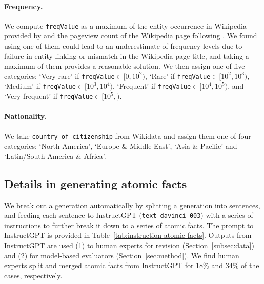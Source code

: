 \documentclass[11pt]{article}
\begin{document}
\paragraph{Frequency.}
We compute {\texttt{freqValue}} as a maximum of the entity occurrence in Wikipedia provided by \citet{kandpal2022large} and the pageview count of the Wikipedia page following \citet{mallen2022not}. We found using one of them could lead to an underestimate of frequency levels due to failure in entity linking or mismatch in the Wikipedia page title, and taking a maximum of them provides a reasonable solution.
We then assign one of five categories: 
{`Very rare'} if {\texttt{freqValue}}$ \in [0, 10^2)$,
{`Rare'} if {\texttt{freqValue}}$ \in [10^2, 10^3)$,
{`Medium'} if {\texttt{freqValue}}$ \in [10^3, 10^4)$,
{`Frequent'} if {\texttt{freqValue}}$ \in [10^4, 10^5)$, and
{`Very frequent'} if {\texttt{freqValue}}$ \in [10^5,)$.

\vspace{-.2em}
\paragraph{Nationality.} We take \texttt{country of citizenship} from Wikidata and assign them one of four categories: `North America', `Europe \& Middle East', `Asia \& Pacific' and `Latin/South America \& Africa'.

\subsection{Details in generating atomic facts}\label{app:atomic-fact-generation}
We break out a generation automatically by splitting a generation into sentences, and feeding each sentence to InstructGPT (\texttt{text-davinci-003}) with a series of instructions to further break it down to a series of atomic facts.
%
The prompt to InstructGPT is provided in Table~\ref{tab:instruction-atomic-facts}.
%
Outputs from InstructGPT are used (1) to human experts for revision (Section~\ref{subsec:data}) and (2) for model-based evaluators (Section~\ref{sec:method}).
%
We find human experts split and merged atomic facts from InstructGPT for 18\% and 34\% of the cases, respectively.
\end{document}
